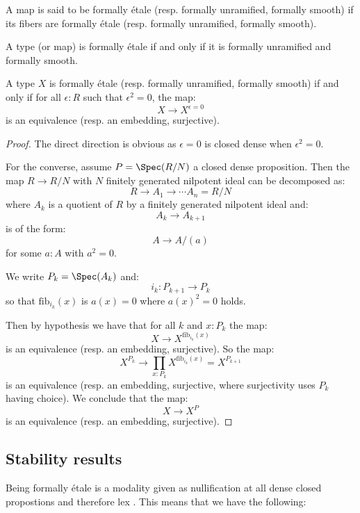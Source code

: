 \begin{definition}
A map is said to be formally étale (resp. formally unramified, formally smooth) if its fibers are formally étale (resp. formally unramified, formally smooth).
\end{definition}

\begin{remark}
A type (or map) is formally étale if and only if it is formally unramified and formally smooth.
\end{remark}

\begin{lemma}\label{etale-unramified-smooth-square-zero}
A type $X$ is formally étale (resp. formally unramified, formally smooth) if and only if for all $\epsilon:R$ such that $\epsilon^2=0$, the map:
\[X\to X^{\epsilon=0}\]
is an equivalence (resp. an embedding, surjective).
\end{lemma}

\begin{proof}
The direct direction is obvious as $\epsilon=0$ is closed dense when $\epsilon^2=0$.

For the converse, assume $P=\Spec(R/N)$ a closed dense proposition. Then the map $R\to R/N$ with $N$ finitely generated nilpotent ideal can be decomposed as:
\[R\to A_1\to \cdots A_n = R/N\]
where $A_k$ is a quotient of $R$ by a finitely generated nilpotent ideal and:
\[A_k\to A_{k+1}\]
is of the form:
\[A\to A/(a)\]
for some $a:A$ with $a^2=0$.

We write $P_k = \Spec(A_k)$ and:
\[i_k:P_{k+1}\to P_k\] 
so that $\mathrm{fib}_{i_k}(x)$ is $a(x)=0$ where $a(x)^2=0$ holds.

Then by hypothesis we have that for all $k$ and $x:P_{k}$ the map:
\[X\to X^{\mathrm{fib}_{i_k}(x)}\]
is an equivalence (resp. an embedding, surjective). So the map:
\[X^{P_{k}} \to \prod_{x:P_{k}}X^{\mathrm{fib}_{i_k}(x)} = X^{P_{k+1}}\]
is an equivalence (resp. an embedding, surjective, where surjectivity uses $P_{k}$ having choice).
We conclude that the map:
\[X\to X^P\]
is an equivalence (resp. an embedding, surjective).
\end{proof}



\subsection{Stability results}

Being formally étale is a modality given as nullification at all dense closed propostions and therefore lex \cite[Corollary 3.12]{modalities}.
This means that we have the following:

